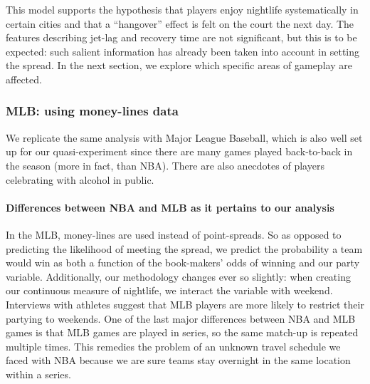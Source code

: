 \documentclass[letterpaper,12pt]{article}
\begin{document}
This model supports the hypothesis that players enjoy nightlife systematically in certain
cities and that a ``hangover'' effect is felt on the court the next day.
The features describing jet-lag and recovery time are not significant, but this is to be
expected: such salient information has already been taken into account in setting the spread.
In the next section, we explore which specific areas of gameplay are affected.


\subsubsection{MLB: using money-lines data}
We replicate the same analysis with
Major League Baseball, which is also well set up for our quasi-experiment since
there are many games played back-to-back in the season (more in fact, than NBA).
There are also anecdotes of players celebrating with alcohol in public.\citep{miller,campbell}

\paragraph{Differences between NBA and MLB as it pertains to our analysis}
In the MLB, money-lines
are used instead of point-spreads. So as opposed to predicting
the likelihood of meeting the spread, we predict the probability
a team would win as both a function of the book-makers'
odds of winning and our party variable. 
Additionally, our methodology changes ever so slightly: when creating our
continuous measure of nightlife, we interact the variable with weekend. Interviews with athletes suggest that MLB players are more likely to
restrict their partying to weekends.
One of the last major differences between NBA and MLB games is that MLB games
are played in series, so the same match-up is repeated multiple times. This remedies
the problem of an unknown travel schedule we faced with NBA because we are sure 
teams stay overnight in the same location within a series.
\end{document}
